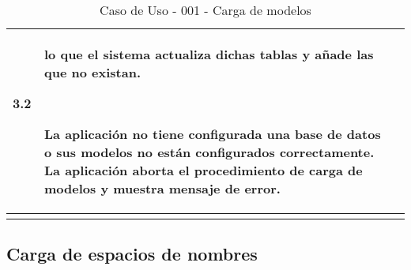 \begin{center}
\begin{longtable}{||p{3.4cm}|p{12cm}||}
\begin{description}
                            lo que el sistema actualiza dichas tablas y añade
                            las que no existan.
                \item[3.2] La aplicación no tiene configurada una base de datos
                            o sus modelos no están configurados correctamente.
                            La aplicación aborta el procedimiento de carga de
                            modelos y muestra mensaje de error.
             \end{description}\\
\hline
\hline
\caption{\label{tab:caso001} Caso de Uso - 001 - Carga de modelos} 
\end{longtable}
\end{center}


\subsection{Carga de espacios de nombres}

